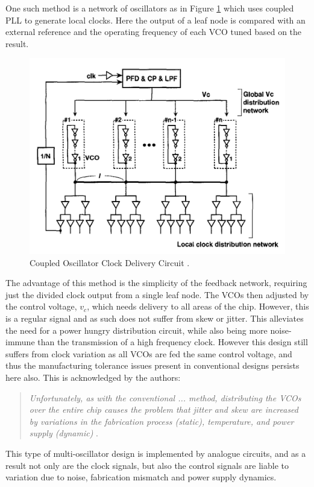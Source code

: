 One such method is a network of oscillators as in Figure \ref{fig:mizuno1998noise} which uses coupled \ac{PLL} to generate local clocks. Here the output of a leaf node is compared with an external reference and the operating frequency of each \ac{VCO} tuned based on the result.
\begin{figure}[h]
	\centering
	\includegraphics[scale=0.7]{../mizuno1998noise}
	\caption{Coupled Oscillator Clock Delivery Circuit \cite{mizuno1998noise}.}
	\label{fig:mizuno1998noise}
\end{figure}
The advantage of this method is the simplicity of the feedback network, requiring just the divided clock output from a single leaf node. The \ac{VCO}s then adjusted by the control voltage, $v_c$, which needs delivery to all areas of the chip. However, this is a regular signal and as such does not suffer from skew or jitter. This alleviates the need for a power hungry distribution circuit, while also being more noise-immune than the transmission of a high frequency clock. However this design still suffers from clock variation as all \ac{VCO}s are fed the same control voltage, and thus the manufacturing tolerance issues present in conventional designs persists here also. This is acknowledged by the authors:
\begin{quotation}
	\textit{Unfortunately, as with the conventional ... method, distributing the \ac{VCO}s over the entire chip causes the problem that jitter and skew are increased by variations in the fabrication process (static), temperature, and power supply (dynamic)} \cite{mizuno1998noise}.
\end{quotation}
This type of multi-oscillator design is implemented by analogue circuits, and as a result not only are the clock signals, but also the control signals are liable to variation due to noise, fabrication mismatch and power supply dynamics.


